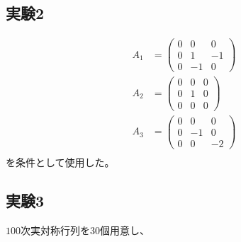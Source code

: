 \subsection{実験2}
\begin{align*}
  A_1 & = \left(
            \begin{array}{ccc}
              0 &  0 &  0 \\
              0 &  1 & -1 \\
              0 & -1 &  0
            \end{array}
          \right) \\
  A_2 & = \left(
            \begin{array}{ccc}
              0 & 0 & 0 \\
              0 & 1 & 0 \\
              0 & 0 & 0
            \end{array}
          \right) \\
  A_3 & = \left(
            \begin{array}{ccc}
              0 &  0 &  0 \\
              0 & -1 &  0 \\
              0 &  0 & -2
            \end{array}
          \right) \\
\end{align*}
を条件として使用した。

\subsection{実験3}
$100$次実対称行列を30個用意し、

